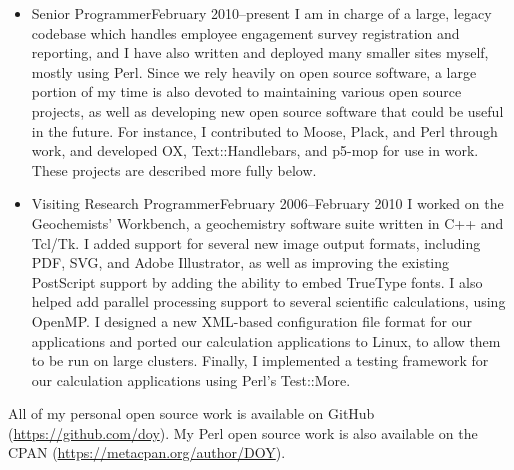 \documentclass[letterpaper]{article}
\begin{document}
\begin{itemize}
    \item {}
                        {Senior Programmer}{February 2010--present} \vspace{6pt} \linebreak
        I am in charge of a large, legacy codebase which handles employee
        engagement survey registration and reporting, and I have also written
        and deployed many smaller sites myself, mostly using Perl. Since we
        rely heavily on open source software, a large portion of my time is
        also devoted to maintaining various open source projects, as well as
        developing new open source software that could be useful in the future.
        For instance, I contributed to Moose, Plack, and Perl through work, and
        developed OX, Text::Handlebars, and p5-mop for use in work. These
        projects are described more fully below.
    \item {}
                        {Visiting Research Programmer}{February 2006--February 2010} \vspace{6pt} \linebreak
        I worked on the Geochemists' Workbench, a geochemistry software suite
        written in C++ and Tcl/Tk. I added support for several new image output
        formats, including PDF, SVG, and Adobe Illustrator, as well as
        improving the existing PostScript support by adding the ability to
        embed TrueType fonts. I also helped add parallel processing support to
        several scientific calculations, using OpenMP. I designed a new
        XML-based configuration file format for our applications and ported our
        calculation applications to Linux, to allow them to be run on large
        clusters. Finally, I implemented a testing framework for our
        calculation applications using Perl's Test::More.
\end{itemize}

All of my personal open source work is available on GitHub
(\url{https://github.com/doy}). My Perl open source work is also available on
the CPAN (\url{https://metacpan.org/author/DOY}).
\end{document}
